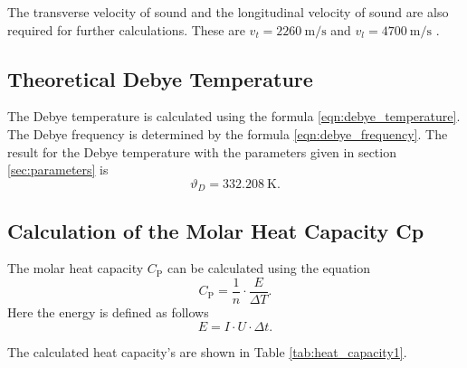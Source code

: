 The transverse velocity of sound and the longitudinal velocity of sound are also required for further calculations.
These are $v_t = \qty{2260}{\meter \per \second}$ and $v_l = \qty{4700}{\meter \per \second}$ \cite{molar_heat}.

\subsection{Theoretical Debye Temperature}
\label{sec:theoretical_debye_temperature}

The Debye temperature is calculated using the formula \ref{eqn:debye_temperature}.
The Debye frequency is determined by the formula \ref{eqn:debye_frequency}.
The result for the Debye temperature with the parameters given in section \ref{sec:parameters} is
\begin{equation*}
	\vartheta_D = \qty{332.208}{\kelvin}.
\end{equation*}


\subsection{Calculation of the Molar Heat Capacity Cp}
\label{sec:calculation_of_the_molar_heat_capacity_cp}

The molar heat capacity $C_{\text{P}}$ can be calculated using the equation
\begin{equation}
	C_{\text{P}} = \frac{1}{n} \cdot \frac{E}{\Delta T}.
\end{equation}
Here the energy is defined as follows
\begin{equation}
	E = I \cdot U \cdot \Delta t.
\end{equation}

The calculated heat capacity's are shown in Table \ref{tab:heat_capacity1}.

